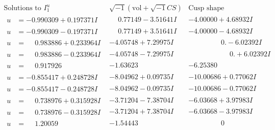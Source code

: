\documentclass[1p]{elsarticle_modified}
\theoremstyle{definition}
\newcommand{\I}{\sqrt{-1}}
\begin{document}
$$\begin{array}{c|c|c}  
\text{Solutions to }I^u_{1}& \I (\text{vol} + \sqrt{-1}CS) & \text{Cusp shape}\\
 \hline 
\begin{aligned}
u &= -0.990309 + 0.197371 I\end{aligned}
 & \phantom{-}0.77149 - 3.51641 I & -4.00000 + 4.68932 I \\ \hline\begin{aligned}
u &= -0.990309 - 0.197371 I\end{aligned}
 & \phantom{-}0.77149 + 3.51641 I & -4.00000 - 4.68932 I \\ \hline\begin{aligned}
u &= \phantom{-}0.983886 + 0.233964 I\end{aligned}
 & -4.05748 + 7.29975 I & \phantom{-0.000000 } 0. - 6.02392 I \\ \hline\begin{aligned}
u &= \phantom{-}0.983886 - 0.233964 I\end{aligned}
 & -4.05748 - 7.29975 I & \phantom{-0.000000 -}0. + 6.02392 I \\ \hline\begin{aligned}
u &= \phantom{-}0.917926\phantom{ +0.000000I}\end{aligned}
 & -1.63623\phantom{ +0.000000I} & -6.25380\phantom{ +0.000000I} \\ \hline\begin{aligned}
u &= -0.855417 + 0.248728 I\end{aligned}
 & -8.04962 + 0.09735 I & -10.00686 + 0.77062 I \\ \hline\begin{aligned}
u &= -0.855417 - 0.248728 I\end{aligned}
 & -8.04962 - 0.09735 I & -10.00686 - 0.77062 I \\ \hline\begin{aligned}
u &= \phantom{-}0.738976 + 0.315928 I\end{aligned}
 & -3.71204 - 7.38704 I & -6.03668 + 3.97983 I \\ \hline\begin{aligned}
u &= \phantom{-}0.738976 - 0.315928 I\end{aligned}
 & -3.71204 + 7.38704 I & -6.03668 - 3.97983 I \\ \hline\begin{aligned}
u &= \phantom{-}1.20059\phantom{ +0.000000I}\end{aligned}
 & -1.54443\phantom{ +0.000000I} & \phantom{-0.000000 } 0 \\ \hline\begin{aligned}

\end{aligned}
\end{array}$$
\end{document}
